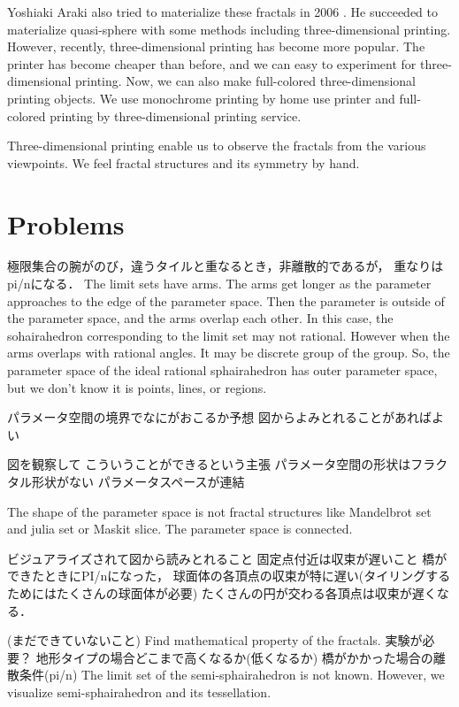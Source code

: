 \documentclass[dvipdfmx]{interact}
\theoremstyle{plain}%
\theoremstyle{definition}
\theoremstyle{remark}
\theoremstyle{problemstyle}
\begin{document}
Yoshiaki Araki also tried to materialize these fractals in 2006
\cite{araki2006materializing}.
He succeeded to materialize quasi-sphere with some methods including
three-dimensional printing.
However, recently, three-dimensional printing has become more popular.
The printer has become cheaper than before, and we can easy to
experiment for three-dimensional printing.
Now, we can also make full-colored three-dimensional printing objects.
We use monochrome printing by home use printer and full-colored
printing by three-dimensional printing service.

Three-dimensional printing enable us to observe the fractals from the
various viewpoints.
We feel fractal structures and its symmetry by hand.

\section{Problems}

極限集合の腕がのび，違うタイルと重なるとき，非離散的であるが，
重なりはpi/nになる．
The limit sets have arms. The arms get longer as the parameter approaches
to the edge of the parameter space.
Then the parameter is outside of the parameter space, and the
arms overlap each other.
In this case, the sohairahedron corresponding to the limit set may not
rational.
However when the arms overlaps with rational angles.
It may be discrete group of the group.
So, the parameter space of the ideal rational sphairahedron has outer
parameter space, but we don't know it is points, lines, or regions.

パラメータ空間の境界でなにがおこるか予想
図からよみとれることがあればよい

図を観察して こういうことができるという主張
パラメータ空間の形状はフラクタル形状がない
パラメータスペースが連結

The shape of the parameter space is not fractal structures like
Mandelbrot set and julia set or Maskit slice. 
The parameter space is connected.

ビジュアライズされて図から読みとれること
固定点付近は収束が遅いこと
橋ができたときにPI/nになった，
球面体の各頂点の収束が特に遅い(タイリングするためにはたくさんの球面体が必要)
たくさんの円が交わる各頂点は収束が遅くなる．

(まだできていないこと)
Find mathematical property of the fractals.
実験が必要？
地形タイプの場合どこまで高くなるか(低くなるか)
橋がかかった場合の離散条件(pi/n)
The limit set of the semi-sphairahedron is not known.
However, we visualize semi-sphairahedron and its tessellation.
\end{document}
